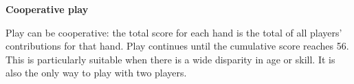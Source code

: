 \documentclass[11pt]{article}
\newcommand\myssection[1]{\begin{center}\bf\small\noindent #1\end{center}}
\begin{document}
\myssection{Cooperative play} Play can be cooperative: the total score
for each hand is the total of all players' contributions for that hand.
Play continues until the cumulative score reaches 56.  This is
particularly suitable when there is a wide disparity in age or skill.
It is also the only way to play with two players.



\end{document}
